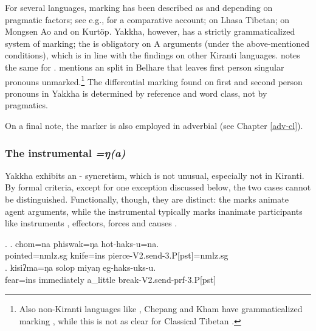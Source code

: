 	
For several  languages,  marking has been described as  and depending on pragmatic factors; see e.g., \citet{LaPolla1995_Ergative} for a comparative account; \citet{Tournadre1991_Rhetorical} on Lhasa Tibetan; \citet{Coupe2007_Mongsen} on Mongsen Ao and \citet{Hyslop2011_Kurtop} on Kurtöp. Yakkha, however, has a strictly grammaticalized system of  marking; the  is obligatory on A arguments (under the above-mentioned conditions), which is in line with the findings on other Kiranti languages. \citet[74]{Doornenbal2009A-grammar} notes  the same for .  \citet[549]{Bickel2003Belhare} mentions an  split in Belhare that leaves first person singular pronouns unmarked.\footnote{Also non-Kiranti languages like , Chepang and Kham have  grammaticalized  marking \citep{LaPolla1995_Ergative}, while this is not as clear for Classical Tibetan \citep{DeLancey2011_Optional}.} The differential marking found on first and second person pronouns in Yakkha is determined by reference and word class, not by pragmatics. 

On a final note, the  marker is also employed in adverbial  (see Chapter \ref{adv-cl}).


\subsubsection{The instrumental \emph{=ŋ(a)}}\label{case-ins}
Yakkha exhibits an - syncretism, which is not unusual, especially not in Kiranti. By formal criteria, except for one exception discussed below, the two cases cannot be distinguished.  Functionally, though, they are distinct: the  marks animate agent arguments, while the instrumental  typically marks inanimate participants like  instruments \Next[a], effectors, forces and causes \Next[b]. 

	\ex. \ag. chom=na phiswak=ŋa hot-haks-u=na.\\
	pointed{\sc =nmlz.sg} knife{\sc =ins} pierce-{\sc V2.send-3.P[pst]=nmlz.sg}\\
	\bg. kisiʔma=ŋa solop miyaŋ eg-haks-uks-u.\\
		fear{\sc =ins} immediately a\_little  break{\sc-V2.send-prf-3.P[pst]}\\
		 
		
